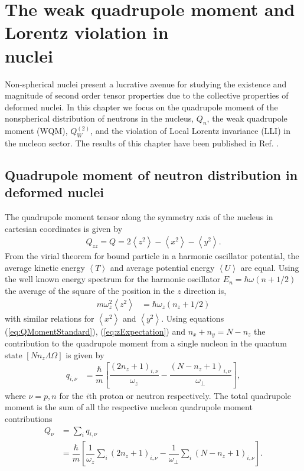 \documentclass[10pt,a4paper, twoside, openright]{report}
\begin{document}
\chapter[The weak quadrupole moment and Lorentz violation in nuclei ]{The weak quadrupole moment and Lorentz violation in \\ nuclei} \label{chap:WQM}
Non-spherical nuclei present a lucrative avenue for studying the existence and magnitude of second order tensor properties due to the collective properties of deformed nuclei. In this chapter we focus on the quadrupole moment of the nonspherical  distribution of neutrons in the nucleus, $Q_{n}$,  the weak quadrupole moment (WQM), $Q_{W}^{(2)}$,  and the violation of Local Lorentz invariance (LLI) in the nucleon sector. The results of this chapter have been published in Ref. \cite{LFWQM2018}.

\section{Quadrupole moment of neutron distribution in deformed nuclei}
The quadrupole moment tensor along the symmetry axis of the nucleus in cartesian coordinates is given by
\begin{align}\label{eq:QMomentStandard}
Q_{zz} = Q = 2\left<z^2\right> - \left<x^2\right> - \left<y^2\right> .
\end{align}
From the virial theorem for bound particle in a harmonic oscillator potential, the average kinetic energy $\left<T\right>$ and average potential energy $\left<U\right>$ are equal. Using the well known energy spectrum for the harmonic oscillator $E_{n} = \hbar\omega(n + 1/2)$  the average of the square of the position in the $z$ direction is,
\begin{align}\label{eq:zExpectation}
m\omega_z^2\left<z^2\right>&= \hbar\omega_z\left(n_z + 1/2\right) 
\end{align}
  with similar relations for $\left<x^2\right>$ and $\left<y^2\right>$. Using equations (\ref{eq:QMomentStandard}), (\ref{eq:zExpectation}) and $n_x + n_y = N - n_z$ the contribution to the quadrupole moment from a single nucleon in the quantum state $\left[N n_z \Lambda \Omega\right]$ is given by
\begin{align} \label{eq:QMomentNucleon}
q_{i,\nu} &= \dfrac{\hbar}{m}\left[\dfrac{\left(2n_z + 1\right)_{i,\nu}}{\omega_z} - \dfrac{\left(N -n_z + 1\right)_{i,\nu}}{\omega_{\perp}}\right] ,
\end{align}
where $\nu = p,n$ for the $i$th proton or neutron respectively. The total quadrupole moment is the sum of all the respective nucleon quadrupole moment contributions
\begin{align}
Q_{\nu} &= \sum_{i} q_{i,\nu} \nonumber\\
&= \dfrac{\hbar}{m}\left[\dfrac{1}{\omega_z}\sum_{i}\left(2n_z + 1\right)_{i,\nu} - \dfrac{1}{\omega_{\perp}}\sum_{i}\left(N -n_z + 1\right)_{i,\nu}\right]. \label{eq:CollectiveMDim} 
\end{align}
\end{document}
